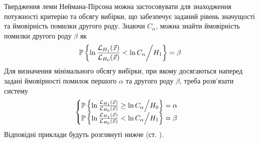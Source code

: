 Твердження леми Неймана-Пірсона можна застосовувати для знаходження потужності критерію та обсягу вибірки, що забезпечує заданий рівень значущості та ймовірність помилки другого роду.
Знаючи $C_{\alpha}$, можна знайти ймовірність помилки другого роду $\beta$ як
\begin{gather*}
    \P \left\{ \ln \frac{\mathcal{L}_{H_1}(\vec{x})}{\mathcal{L}_{H_0}(\vec{x})} < \ln C_{\alpha} \middle/ H_1\right\} = \beta
\end{gather*}
Для визначення мінімального обсягу вибірки, при якому досягаються наперед задані ймовірності помилок першого $\alpha$ та другого роду $\beta$,
треба розв'язати систему
\begin{gather*}
    \begin{cases}
        \P \left\{ \ln \frac{\mathcal{L}_{H_1}(\vec{x})}{\mathcal{L}_{H_0}(\vec{x})} \geq \ln C_{\alpha} \middle/ H_0\right\} = \alpha \\
        \P \left\{ \ln \frac{\mathcal{L}_{H_1}(\vec{x})}{\mathcal{L}_{H_0}(\vec{x})} < \ln C_{\alpha} \middle/ H_1 \right\} = \beta
    \end{cases}
\end{gather*}
Відповідні приклади будуть розглянуті нижче (ст. \pageref{np_lemma_examples}).

